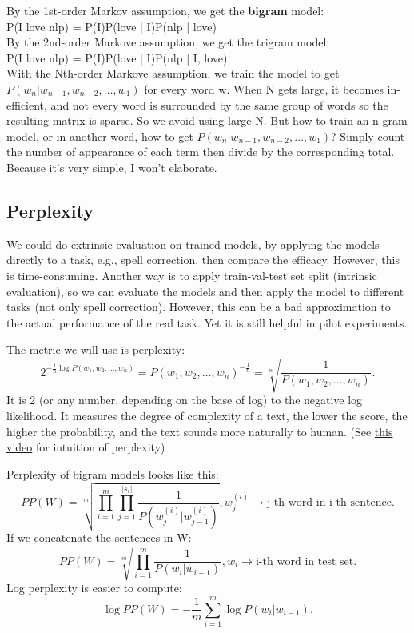\documentclass{report}
\begin{document}
\noindent By the 1st-order Markov assumption, we get the \textbf{bigram} model:\\

{\center P(I love nlp) = P(I)P(love | I)P(nlp | love)}\\

\noindent By the 2nd-order Markove assumption, we get the trigram model:\\

{\center P(I love nlp) = P(I)P(love | I)P(nlp | I, love)}\\

\noindent With the Nth-order Markove assumption, we train the model to get $P(w_n | w_{n-1}, w_{n-2}, \ldots, w_1)$ for every word w. When N gets large, it becomes in-efficient, and not every word is surrounded by the same group of words so the resulting matrix is sparse. So we avoid using large N. But how to train an n-gram model, or in another word, how to get $P(w_n | w_{n-1}, w_{n-2}, \ldots, w_1)$? Simply count the number of appearance of each term then divide by the corresponding total. Because it's very simple, I won't elaborate.
\subsection{Perplexity}
We could do extrinsic evaluation on trained models, by applying the models directly to a task, e.g., spell correction, then compare the efficacy. However, this is time-consuming. Another way is to apply train-val-test set split (intrinsic evaluation), so we can evaluate the models and then apply the model to different tasks (not only spell correction). However, this can be a bad approximation to the actual performance of the real task. Yet it is still helpful in pilot experiments.

The metric we will use is perplexity: \[
2^{-\frac{1}{n} \log P(w_1, w_2, \ldots, w_n)} = P(w_1, w_2, \ldots, w_n)^{-\frac{1}{n}} = \sqrt[n]{\frac{1}{P(w_1,w_2,\ldots,w_n)}} 
.\] It is 2 (or any number, depending on the base of log) to the negative log likelihood. It measures the degree of complexity of a text, the lower the score, the higher the probability, and the text sounds more naturally to human. (See \href{https://www.youtube.com/watch?v=NCyCkgMLRiY}{this video} for intuition of perplexity)

Perplexity of bigram models looks like this: \[
	PP(W) = \sqrt[m]{\prod_{i=1}^{m} \prod_{j=1}^{|s_i|} \frac{1}{P(w^{(i)}_j|w^{(i)}_{j-1} )}  }, w^{(i)}_j \to \text{j-th word in i-th sentence}
.\] 
If we concatenate the sentences in W: \[
	PP(W) = \sqrt[m]{\prod_{i=1}^{m} \frac{1}{P(w_i | w_{i-1}) }}, w_i \to \text{i-th word in test set}
.\] 
Log perplexity is easier to compute: \[
	\log PP(W) = -\frac{1}{m} \sum_{i=1}^{m} \log P(w_i | w_{i-1})
.\] 
\end{document}
